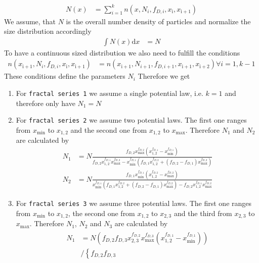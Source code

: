 \begin{align}
N(x) &= \sum_{i=1}^k n(x,N_i,f_{D,i},x_\mathrm{i},x_\mathrm{i+1})
\end{align}
We assume, that $N$ is the overall number density of particles and normalize the size distribution accordingly
\begin{align}
\int N(x) \mathrm{d}x &= N
\end{align}
To have a continuous sized distribution we also need to fulfill the conditions
\begin{align}
n(x_\mathrm{i+1},N_i,f_{D,i},x_\mathrm{i},x_\mathrm{i+1}) &= n(x_\mathrm{i+1},N_{i+1},f_{D,i+1},x_\mathrm{i+1},x_\mathrm{i+2}) \forall i =1,k-1
\end{align}
These conditions define the parameters $N_i$ Therefore we get
\begin{enumerate}
\item For \texttt{fractal series 1} we assume a single potential law, i.e. $k=1$ and therefore only have $N_1=N$
\item For \texttt{fractal series 2} we assume two potential laws. The first one ranges from $x_\mathrm{min}$ to $x_{1,2}$ and the second one from $x_{1,2}$ to $x_\mathrm{max}$. Therefore $N_1$ and $N_2$ are calculated by
\begin{align}
    N_1 &= N \frac{f_{D,2} x_\mathrm{max}^{f_{D,2}}
   \left(x_{1,2}^{f_{D,1}}-x_\mathrm{min}^{f_{D,1}}\right)}{f_{D,2}
   x_{1,2}^{f_{D,1}} x_\mathrm{max}^{f_{D,2}}-x_\mathrm{min}^{f_{D,1}} \left(f_{D,1}
   x_{1,2}^{f_{D,2}}+(f_{D,2}-f_{D,1}) x_\mathrm{max}^{f_{D,2}}\right)}\\
    N_2 &= N \frac{f_{D,1} x_\mathrm{min}^{f_{D,1}}
   \left(x_{1,2}^{f_{D,2}}-x_\mathrm{max}^{f_{D,2}}\right)}{x_\mathrm{min}^{f_{D,1}}
   \left(f_{D,1} x_{1,2}^{f_{D,2}}+(f_{D,2}-f_{D,1})
   x_\mathrm{max}^{f_{D,2}}\right)-f_{D,2} x_{1,2}^{f_{D,1}} x_\mathrm{max}^{f_{D,2}}}
\end{align}
\item For \texttt{fractal series 3} we assume three potential laws. The first one ranges from $x_\mathrm{min}$ to $x_{1,2}$, the second one from $x_{1,2}$ to $x_{2,3}$ and the third from $x_{2,3}$ to $x_\mathrm{max}$. Therefore $N_1$, $N_2$ and $N_3$ are calculated by
\begin{align}
\begin{split}
    N_1 &= N \left(f_{D,2} f_{D,3}x_{2,3}^{f_{D,2}} x_\mathrm{max}^{f_{D,3}}
   \left(x_{1,2}^{f_{D,1}}-x_\mathrm{min}^{f_{D,1}}\right)\right) \\
   &/  \left\{ f_{D,2} f_{D,3}

\end{split}
\end{align}
\end{enumerate}
